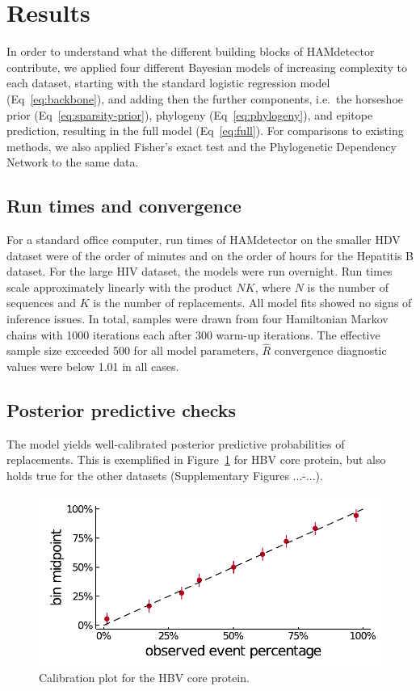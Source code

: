 \documentclass{bioinfo}
\begin{document}
\section{Results} \label{sec:results}

In order to understand what the different building blocks of HAMdetector contribute, we applied four different Bayesian models of increasing complexity to each dataset, starting with the standard logistic regression model (Eq~\ref{eq:backbone}), and adding then the further components, i.e.\ the horseshoe prior (Eq~\ref{eq:sparsity-prior}), phylogeny (Eq~\ref{eq:phylogeny}), and epitope prediction, resulting in the full model (Eq~\ref{eq:full}). For comparisons to existing methods, we also applied Fisher's exact test and the Phylogenetic Dependency Network \cite{Carlson2008} to the same data.

\subsection{Run times and convergence}
For a standard office computer, run times of HAMdetector on the smaller HDV dataset were of the order of minutes and on the order of hours for the Hepatitis B dataset. For the large HIV dataset, the models were run overnight. Run times scale approximately linearly with the product \(NK\), where \(N\) is the number of sequences and \(K\) is the number of replacements. All model fits showed no signs of inference issues. In total, samples were drawn from four Hamiltonian Markov chains with 1000 iterations each after 300 warm-up iterations. The effective sample size exceeded 500 for all model parameters, $\hat{R}$ convergence diagnostic values were below 1.01 in all cases.

\subsection{Posterior predictive checks}
The model yields well-calibrated posterior predictive probabilities of replacements. This is exemplified in Figure~\ref{fig:calibration} for HBV core protein, but also holds true for the other datasets (Supplementary Figures ...-...).

\begin{figure}[!ht]
 \includegraphics[width=1.0\linewidth]{plots/phylogeny_calibration.pdf}  
  \caption{Calibration plot for the HBV core protein.}
  \label{fig:calibration}
\end{figure}
\end{document}
